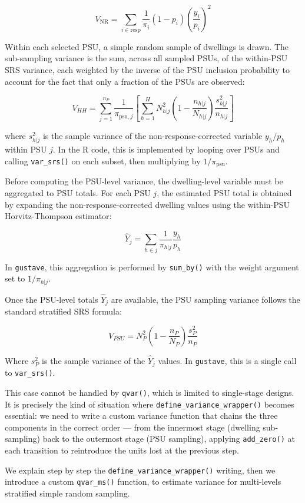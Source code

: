 \documentclass[
]{article}
\begin{document}
\[V_{\text{NR}} = \sum_{i\in \text{resp}}{ \frac{1}{\pi_i} (1-p_i) \left(\frac{y_i}{p_i}\right)^2}\]

Within each selected PSU, a simple random sample of dwellings is drawn.
The sub-sampling variance is the sum, across all sampled PSUs, of the
within-PSU SRS variance, each weighted by the inverse of the PSU
inclusion probability to account for the fact that only a fraction of
the PSUs are observed:

\[V_{HH} = \sum_{j=1}^{n_P}{\frac{1}{\pi_{\text{psu},j}} \left[ \sum_{h=1}^{H} N_{h|j}^2 \left(1 - \frac{n_{h|j}}{N_{h|j}}\right) \frac{s_{h|j}^2}{n_{h|j}} \right]}\]

where \(s_{h|j}^2\) is the sample variance of the non-response-corrected
variable \(y_h / p_h\) within PSU \(j\). In the R code, this is
implemented by looping over PSUs and calling \texttt{var\_srs()} on each
subset, then multiplying by \(1/\pi_{\text{psu}}\).

Before computing the PSU-level variance, the dwelling-level variable
must be aggregated to PSU totals. For each PSU \(j\), the estimated PSU
total is obtained by expanding the non-response-corrected dwelling
values using the within-PSU Horvitz-Thompson estimator:

\[\hat Y_{j} = \sum_{h\in j} \frac{1}{\pi_{h|j}}\frac{y_{h}}{p_h}\]

In \texttt{gustave}, this aggregation is performed by \texttt{sum\_by()}
with the weight argument set to \(1/{\pi_{h|j}}\).

Once the PSU-level totals \(\hat Y_{j}\) are available, the PSU sampling
variance follows the standard stratified SRS formula:

\[V_{PSU} = N_{P}^2 \left( 1 - \frac{n_{P}}{N_{P}} \right)\frac{s^2_{P}}{n_{P}}\]

Where \(s^2_{P}\) is the sample variance of the \(\hat Y_{j}\) values.
In \texttt{gustave}, this is a single call to \texttt{var\_srs()}.

This case cannot be handled by \texttt{qvar()}, which is limited to
single-stage designs. It is precisely the kind of situation where
\texttt{define\_variance\_wrapper()} becomes essential: we need to write
a custom variance function that chains the three components in the
correct order --- from the innermost stage (dwelling sub-sampling) back
to the outermost stage (PSU sampling), applying \texttt{add\_zero()} at
each transition to reintroduce the units lost at the previous step.

We explain step by step the \texttt{define\_variance\_wrapper()}
writing, then we introduce a custom \texttt{qvar\_ms()} function, to
estimate variance for multi-levels stratified simple random sampling.
\end{document}

